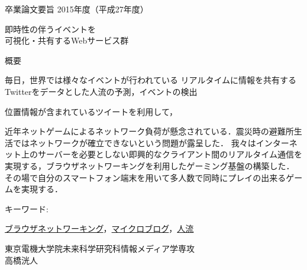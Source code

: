 \newpage
\pagestyle{plain}
\begin{center}
\LARGE{卒業論文要旨 \hspace{10mm} 2015年度（平成27年度）}\\

\vspace{10mm}

\LARGE{即時性の伴うイベントを\\可視化・共有するWebサービス群}\\
\end{center}

\begin{center}
概要\\
\end{center}

毎日，世界では様々なイベントが行われている
リアルタイムに情報を共有する
Twitterをデータとした人流の予測，イベントの検出

位置情報が含まれているツイートを利用して，

近年ネットゲームによるネットワーク負荷が懸念されている．震災時の避難所生活ではネットワークが確立できないという問題が露呈した．
我々はインターネット上のサーバーを必要としない即興的なクライアント間のリアルタイム通信を実現する，ブラウザネットワーキングを利用したゲーミング基盤の構築した．
その場で自分のスマートフォン端末を用いて多人数で同時にプレイの出来るゲームを実現する．

\begin{flushleft}キーワード:\\
\end{flushleft}
{\underline{ブラウザネットワーキング}，\underline{マイクロブログ}，\underline{人流}}


\begin{center}
\vspace{10mm}
\begin{flushright}\large 東京電機大学院未来科学研究科情報メディア学専攻\\
\LARGE 高橋洸人\\
\end{flushright}
\end{center}

